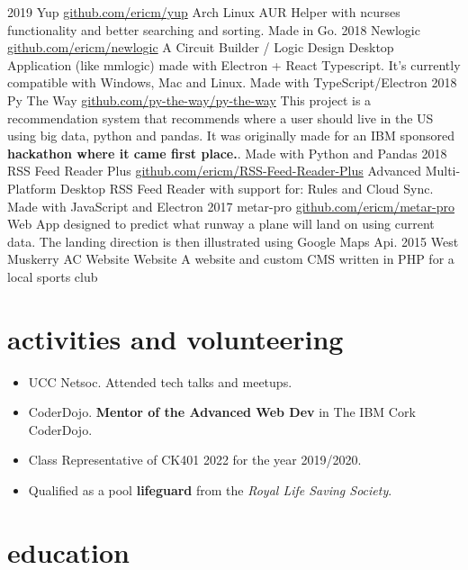 \documentclass[10pt]{friggeri-cv}
\begin{document}
\begin{entrylist}
  \entry
    {2019}
    {Yup}
    {\href{https://github.com/ericm/yup}{github.com/ericm/yup}}
    {Arch Linux AUR Helper with ncurses functionality and better searching and sorting. Made in Go. }
  \entry
    {2018}
    {Newlogic}
    {\href{https://github.com/ericm/newlogic}{github.com/ericm/newlogic}}
    {A Circuit Builder / Logic Design Desktop Application (like mmlogic) made with Electron + React Typescript. It's currently compatible with Windows, Mac and Linux. Made with TypeScript/Electron}
  \entry
    {2018}
    {Py The Way}
    {\href{https://github.com/py-the-way/py-the-way}{github.com/py-the-way/py-the-way}}
    {This project is a recommendation system that recommends where a user should live in the US using big data, python and pandas. It was originally made for an IBM sponsored \textbf{hackathon where it came first place.}. Made with Python and Pandas}
  \entry
    {2018}
    {RSS Feed Reader Plus}
    {\href{https://github.com/ericm/RSS-Feed-Reader-Plus}{github.com/ericm/RSS-Feed-Reader-Plus}}
    {Advanced Multi-Platform Desktop RSS Feed Reader with support for: Rules and Cloud Sync. Made with JavaScript and Electron}
  \entry
    {2017}
    {metar-pro}
    {\href{https://github.com/ericm/metar-pro}{github.com/ericm/metar-pro}}
    {Web App designed to predict what runway a plane will land on using current data. The landing direction is then illustrated using Google Maps Api.}
  \entry
    {2015}
    {West Muskerry AC Website}
    {Website}
    {A website and custom CMS written in PHP for a local sports club}

\end{entrylist}

\section{activities and volunteering}
\begin{itemize}
    \item UCC Netsoc. Attended tech talks and meetups.
    \item CoderDojo. \textbf{Mentor of the Advanced Web Dev} in The IBM Cork CoderDojo.
    \item Class Representative of CK401 2022 for the year 2019/2020.
    \item Qualified as a pool \textbf{lifeguard} from the \textit{Royal Life Saving Society}.
\end{itemize}

\section{education}
\end{document}
